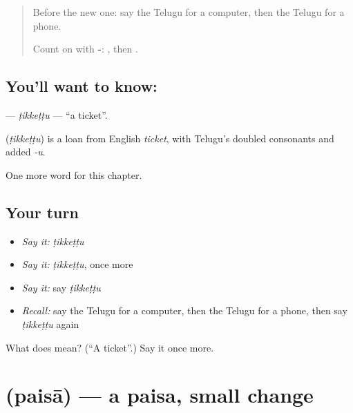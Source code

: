 \label{lesson:TE-C130-tikkettu}



\begin{quote}
Before the new one: say the Telugu for a computer, then the Telugu for a phone.

Count on with \textbf{-}: \textbf{}, then \textbf{}.
\end{quote}

\subsection*{You'll want to know: }
\textbf{} — \emph{ṭikkeṭṭu} — \textquotedblleft{}a ticket\textquotedblright{}.

\begin{cousinweb}
\textbf{} (\emph{ṭikkeṭṭu}) is a loan from English \emph{ticket}, with Telugu's doubled consonants and added \emph{-u}.
\end{cousinweb}

\begin{grammarlens}[title={What you've built}]
One more word for this chapter.
\end{grammarlens}

\subsection*{Your turn}
\begin{itemize}
\raggedright
  \item \emph{Say it:} \emph{ṭikkeṭṭu}
  \item \emph{Say it:} \emph{ṭikkeṭṭu}, once more
  \item \emph{Say it:} say \emph{ṭikkeṭṭu}
  \item \emph{Recall:} say the Telugu for a computer, then the Telugu for a phone, then say \emph{ṭikkeṭṭu} again
\end{itemize}

\begin{tcolorbox}[breakable,colback=teal!4,colframe=teal!35!black,title={Before you move on}]
What does  mean? (\textquotedblleft{}A ticket\textquotedblright{}.) Say it once more.
\end{tcolorbox}
\section[\texorpdfstring{\te{పైసా} (paisā)}{పైసా (paisā)}]{ (paisā) — a paisa, small change}

